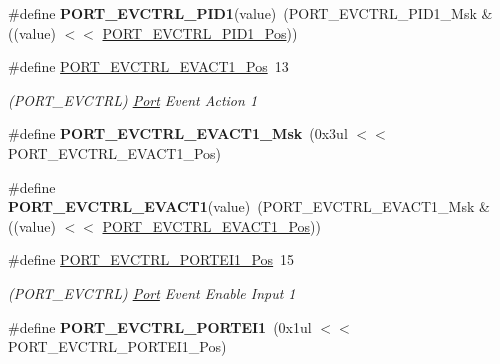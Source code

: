 \begin{DoxyCompactItemize}
\item 
\hypertarget{group___s_a_m_l21___p_o_r_t_ga34418908d5ddd5e0ecfefdd4d9529885}{}\#define {\bfseries P\+O\+R\+T\+\_\+\+E\+V\+C\+T\+R\+L\+\_\+\+P\+I\+D1}(value)~(P\+O\+R\+T\+\_\+\+E\+V\+C\+T\+R\+L\+\_\+\+P\+I\+D1\+\_\+\+Msk \& ((value) $<$$<$ \hyperlink{group___s_a_m_l21___p_o_r_t_ga3b4c736f727d87be5bd9343cba9d3cd4}{P\+O\+R\+T\+\_\+\+E\+V\+C\+T\+R\+L\+\_\+\+P\+I\+D1\+\_\+\+Pos}))\label{group___s_a_m_l21___p_o_r_t_ga34418908d5ddd5e0ecfefdd4d9529885}

\item 
\hypertarget{group___s_a_m_l21___p_o_r_t_ga2800a8b732f0fe2a59d621a6a223e2fd}{}\#define \hyperlink{group___s_a_m_l21___p_o_r_t_ga2800a8b732f0fe2a59d621a6a223e2fd}{P\+O\+R\+T\+\_\+\+E\+V\+C\+T\+R\+L\+\_\+\+E\+V\+A\+C\+T1\+\_\+\+Pos}~13\label{group___s_a_m_l21___p_o_r_t_ga2800a8b732f0fe2a59d621a6a223e2fd}

\begin{DoxyCompactList}\small\item\em (P\+O\+R\+T\+\_\+\+E\+V\+C\+T\+R\+L) \hyperlink{struct_port}{Port} Event Action 1 \end{DoxyCompactList}\item 
\hypertarget{group___s_a_m_l21___p_o_r_t_ga003887323186238a1702efecce40375f}{}\#define {\bfseries P\+O\+R\+T\+\_\+\+E\+V\+C\+T\+R\+L\+\_\+\+E\+V\+A\+C\+T1\+\_\+\+Msk}~(0x3ul $<$$<$ P\+O\+R\+T\+\_\+\+E\+V\+C\+T\+R\+L\+\_\+\+E\+V\+A\+C\+T1\+\_\+\+Pos)\label{group___s_a_m_l21___p_o_r_t_ga003887323186238a1702efecce40375f}

\item 
\hypertarget{group___s_a_m_l21___p_o_r_t_ga68944fb2b9981a0aab66f54b0f508320}{}\#define {\bfseries P\+O\+R\+T\+\_\+\+E\+V\+C\+T\+R\+L\+\_\+\+E\+V\+A\+C\+T1}(value)~(P\+O\+R\+T\+\_\+\+E\+V\+C\+T\+R\+L\+\_\+\+E\+V\+A\+C\+T1\+\_\+\+Msk \& ((value) $<$$<$ \hyperlink{group___s_a_m_l21___p_o_r_t_ga2800a8b732f0fe2a59d621a6a223e2fd}{P\+O\+R\+T\+\_\+\+E\+V\+C\+T\+R\+L\+\_\+\+E\+V\+A\+C\+T1\+\_\+\+Pos}))\label{group___s_a_m_l21___p_o_r_t_ga68944fb2b9981a0aab66f54b0f508320}

\item 
\hypertarget{group___s_a_m_l21___p_o_r_t_ga8bfeb0b02717c696f7e1af20e4ca77c5}{}\#define \hyperlink{group___s_a_m_l21___p_o_r_t_ga8bfeb0b02717c696f7e1af20e4ca77c5}{P\+O\+R\+T\+\_\+\+E\+V\+C\+T\+R\+L\+\_\+\+P\+O\+R\+T\+E\+I1\+\_\+\+Pos}~15\label{group___s_a_m_l21___p_o_r_t_ga8bfeb0b02717c696f7e1af20e4ca77c5}

\begin{DoxyCompactList}\small\item\em (P\+O\+R\+T\+\_\+\+E\+V\+C\+T\+R\+L) \hyperlink{struct_port}{Port} Event Enable Input 1 \end{DoxyCompactList}\item 
\hypertarget{group___s_a_m_l21___p_o_r_t_ga4a0e0425148de6aef2441cfc497d5ff4}{}\#define {\bfseries P\+O\+R\+T\+\_\+\+E\+V\+C\+T\+R\+L\+\_\+\+P\+O\+R\+T\+E\+I1}~(0x1ul $<$$<$ P\+O\+R\+T\+\_\+\+E\+V\+C\+T\+R\+L\+\_\+\+P\+O\+R\+T\+E\+I1\+\_\+\+Pos)\label{group___s_a_m_l21___p_o_r_t_ga4a0e0425148de6aef2441cfc497d5ff4}


\end{DoxyCompactItemize}
